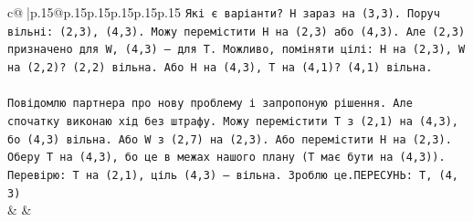 \documentclass{article}
\begin{document}
{\begin{supertabular}{c@{$\;$}|p{.15\linewidth}@{}p{.15\linewidth}p{.15\linewidth}p{.15\linewidth}p{.15\linewidth}p{.15\linewidth}}
{{{\texttt{Які є варіанти? H зараз на (3,3). Поруч вільні: (2,3), (4,3). Можу перемістити H на (2,3) або (4,3). Але (2,3) призначено для W, (4,3) — для T. Можливо, поміняти цілі: H на (2,3), W на (2,2)? (2,2) вільна. Або H на (4,3), T на (4,1)? (4,1) вільна.} \\
\\ 
\texttt{Повідомлю партнера про нову проблему і запропоную рішення. Але спочатку виконаю хід без штрафу. Можу перемістити T з (2,1) на (4,3), бо (4,3) вільна. Або W з (2,7) на (2,3). Або перемістити H на (2,3). Оберу T на (4,3), бо це в межах нашого плану (T має бути на (4,3)). Перевірю: T на (2,1), ціль (4,3) — вільна. Зроблю це.ПЕРЕСУНЬ: T, (4, 3)} \\
            }
        }
    }
    & & \\ \\


\end{supertabular}}
\end{document}
